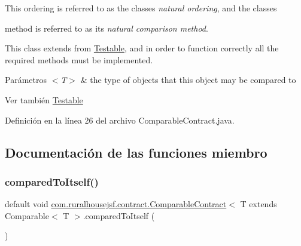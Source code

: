 This ordering is referred to as the classes {\itshape natural ordering}, and the classes
\begin{DoxyCode}{0}
\end{DoxyCode}
 method is referred to as its {\itshape natural comparison method}. 

This class extends from \mbox{\hyperlink{interfacecom_1_1ruralhousejsf_1_1contract_1_1_testable}{Testable}}, and in order to function correctly all the required methods must be implemented.


\begin{DoxyParams}{Parámetros}
{\em $<$\+T$>$} & the type of objects that this object may be compared to\\
\hline
\end{DoxyParams}
\begin{DoxySeeAlso}{Ver también}
\mbox{\hyperlink{interfacecom_1_1ruralhousejsf_1_1contract_1_1_testable}{Testable}} 
\end{DoxySeeAlso}


Definición en la línea 26 del archivo Comparable\+Contract.\+java.



\subsection{Documentación de las funciones miembro}
\mbox{\label{interfacecom_1_1ruralhousejsf_1_1contract_1_1_comparable_contract_ad21966d20e5fffd0fa13cd021c262f11}} 
\subsubsection{\texorpdfstring{comparedToItself()}{comparedToItself()}}
{\footnotesize\ttfamily default void \mbox{\hyperlink{interfacecom_1_1ruralhousejsf_1_1contract_1_1_comparable_contract}{com.\+ruralhousejsf.\+contract.\+Comparable\+Contract}}$<$ T extends Comparable$<$ T $>$.compared\+To\+Itself (\begin{DoxyParamCaption}{ }\end{DoxyParamCaption})}



